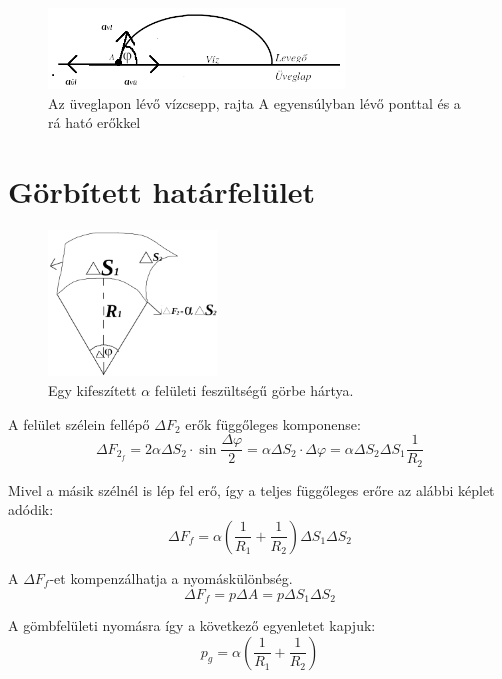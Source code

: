 \documentclass[12pt,a4paper]{scrartcl}
\begin{document}
\begin{figure}[htbp]
	\begin{center}
		\includegraphics[width=0.7\textwidth]{tetel72.png}
		\caption{Az üveglapon lévő vízcsepp, rajta A egyensúlyban lévő ponttal és a rá ható erőkkel \label{fig:illeszkedesi_szog}}
	\end{center}
\end{figure}

\section{Görbített határfelület}

\begin{figure}[htbp]
	\begin{center}
		\includegraphics[width=0.4\textwidth]{tetel73.png}
		\caption{Egy kifeszített $\alpha$ felületi feszültségű görbe hártya. }
	\end{center}
\end{figure}

\noindent
A felület szélein fellépő $\Delta F_{2}$ erők függőleges komponense: $$ \Delta F_{2_{f}} =2\alpha\Delta S_{2}\cdot\sin{\frac{\Delta\varphi}{2}}=\alpha\Delta S_{2}\cdot\Delta\varphi=\alpha\Delta S_{2}\Delta S_{1} \frac{1}{R_2} $$

\noindent
Mivel a másik szélnél is lép fel erő, így a teljes függőleges erőre az alábbi képlet adódik: $$ \Delta F_{f}=\alpha(\frac{1}{R_{1}}+\frac{1}{R_{2}})\Delta S_{1}\Delta S_{2} $$

\noindent
A $\Delta F_{f}$-et kompenzálhatja a nyomáskülönbség. $$ \Delta F_{f}=p\Delta A=p\Delta S_{1}\Delta S_{2}$$

\noindent
A gömbfelületi nyomásra így a következő egyenletet kapjuk: $$p_{g}=\alpha(\frac{1}{R_{1}}+\frac{1}{R_{2}}) $$
\end{document}

